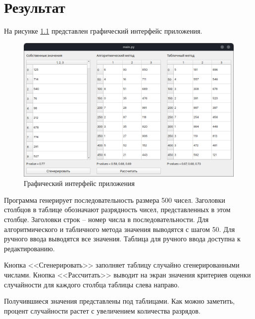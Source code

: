\chapter{Результат}

На рисунке \ref{fig:gui} представлен графический интерфейс приложения.

\begin{figure}[H]
	\centering
	\includegraphics[width=\linewidth]{assets/gui.png}
	\caption{Графический интерфейс приложения}
	\label{fig:gui}
\end{figure}

Программа генерирует последовательность размера 500 чисел.
Заголовки столбцов в таблице обозначают разрядность чисел, представленных в 
этом столбце. Заголовки строк -- номер числа в последовательности. Для алгоритмического 
и табличного метода значения выводятся с шагом 50. Для ручного ввода выводятся все значения.
Таблица для ручного ввода доступна к редактированию.

Кнопка <<Сгенерировать>> заполняет таблицу случайно сгенерированными числами. Кнопка <<Рассчитать>>
выводит на экран значения критериев оценки случайности для каждого столбца таблицы слева направо.

Получившиеся значения представлены под таблицами. Как можно заметить, процент случайности растет с увеличением
количества разрядов.